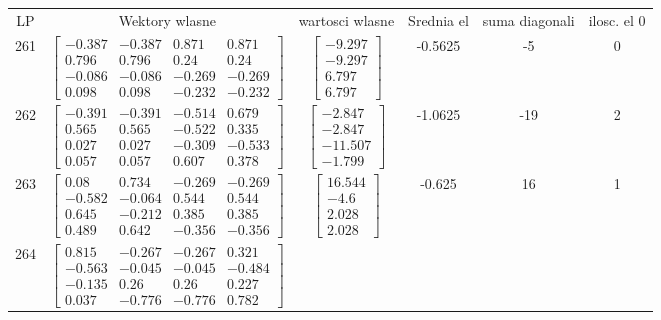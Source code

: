 \documentclass[a4paper,12pt]{article}
\begin{document}
\bgroup {} \vspace{0.2in} \begin{tabular}{c c c c c c}
LP &Wektory wlasne & wartosci wlasne & Srednia el & suma diagonali & ilosc. el 0\\
261
&
$\begin{bmatrix} -0.387 & -0.387 & 0.871 & 0.871 \\ 0.796 & 0.796 & 0.24 & 0.24 \\ -0.086 & -0.086 & -0.269 & -0.269 \\ 0.098 & 0.098 & -0.232 & -0.232 \end{bmatrix}$
&
$\begin{bmatrix} -9.297 \\ -9.297 \\ 6.797 \\ 6.797 \end{bmatrix}$
&
-0.5625
&
-5
&
0
\\
262
&
$\begin{bmatrix} -0.391 & -0.391 & -0.514 & 0.679 \\ 0.565 & 0.565 & -0.522 & 0.335 \\ 0.027 & 0.027 & -0.309 & -0.533 \\ 0.057 & 0.057 & 0.607 & 0.378 \end{bmatrix}$
&
$\begin{bmatrix} -2.847 \\ -2.847 \\ -11.507 \\ -1.799 \end{bmatrix}$
&
-1.0625
&
-19
&
2
\\
263
&
$\begin{bmatrix} 0.08 & 0.734 & -0.269 & -0.269 \\ -0.582 & -0.064 & 0.544 & 0.544 \\ 0.645 & -0.212 & 0.385 & 0.385 \\ 0.489 & 0.642 & -0.356 & -0.356 \end{bmatrix}$
&
$\begin{bmatrix} 16.544 \\ -4.6 \\ 2.028 \\ 2.028 \end{bmatrix}$
&
-0.625
&
16
&
1
\\
264
&
$\begin{bmatrix} 0.815 & -0.267 & -0.267 & 0.321 \\ -0.563 & -0.045 & -0.045 & -0.484 \\ -0.135 & 0.26 & 0.26 & 0.227 \\ 0.037 & -0.776 & -0.776 & 0.782 \end{bmatrix}$

\end{tabular}
\end{document}
